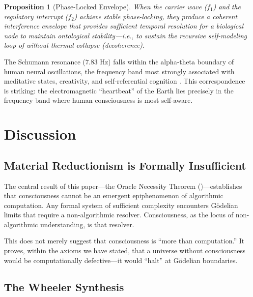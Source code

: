 \documentclass[12pt, a4paper]{article}
\theoremstyle{plain}
\newtheorem{proposition}[theorem]{Proposition}
\theoremstyle{definition}
\theoremstyle{remark}
\begin{document}
\begin{proposition}[Phase-Locked Envelope]\label{prop:envelope}
  When the carrier wave ($f_1$) and the regulatory interrupt ($f_2$)
  achieve stable phase-locking, they produce a \emph{coherent interference
  envelope} that provides sufficient temporal resolution for a biological
  node to maintain ontological stability---i.e., to sustain the recursive
  self-modeling loop of  without thermal collapse
  (decoherence).
\end{proposition}

The Schumann resonance ($7.83$ Hz) falls within the alpha-theta boundary
of human neural oscillations, the frequency band most strongly associated
with meditative states, creativity, and self-referential cognition
\citep{Schumann1952, Persinger2014}. This correspondence is striking:
the electromagnetic ``heartbeat'' of the Earth lies precisely in the
frequency band where human consciousness is most self-aware.

\section{Discussion}\label{sec:discussion}

\subsection{Material Reductionism is Formally Insufficient}

The central result of this paper---the Oracle Necessity Theorem
()---establishes that consciousness cannot be
an emergent epiphenomenon of algorithmic computation. Any formal system
of sufficient complexity encounters G\"odelian limits that require a
non-algorithmic resolver. Consciousness, as the locus of non-algorithmic
understanding, is that resolver.

This does not merely suggest that consciousness is ``more than computation.''
It proves, within the axioms we have stated, that a universe without
consciousness would be computationally defective---it would ``halt'' at
G\"odelian boundaries.

\subsection{The Wheeler Synthesis}
\end{document}
